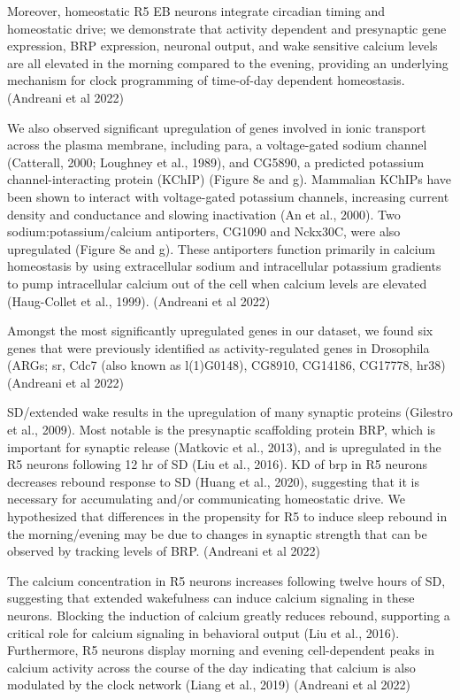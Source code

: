     Moreover, homeostatic R5 EB neurons integrate circadian timing and homeostatic drive; we demonstrate that activity dependent and presynaptic gene expression, BRP expression, neuronal output, and wake sensitive calcium levels are all elevated in the morning compared to the evening, providing an underlying mechanism for clock programming of time-of-day dependent homeostasis.
    \cite{andreaniCircadianProgrammingEllipsoid2022} (Andreani et al 2022)

    We also observed significant upregulation of genes involved in ionic transport across the plasma membrane, including para, a voltage-gated sodium channel (Catterall, 2000; Loughney et al., 1989), and CG5890, a predicted potassium channel-interacting protein (KChIP) (Figure 8e and g). Mammalian KChIPs have been shown to interact with voltage-gated potassium channels, increasing current density and conductance and slowing inactivation (An et al., 2000). Two sodium:potassium/calcium antiporters, CG1090 and Nckx30C, were also upregulated (Figure 8e and g). These antiporters function primarily in calcium homeostasis by using extracellular sodium and intracellular potassium gradients to pump intracellular calcium out of the cell when calcium levels are elevated (Haug-Collet et al., 1999).
    \cite{andreaniCircadianProgrammingEllipsoid2022} (Andreani et al 2022)

    Amongst the most significantly upregulated genes in our dataset, we found six genes that were previously identified as activity-regulated genes in Drosophila (ARGs; sr, Cdc7 (also known as l(1)G0148), CG8910, CG14186, CG17778, hr38)
    \cite{andreaniCircadianProgrammingEllipsoid2022} (Andreani et al 2022)

    SD/extended wake results in the upregulation of many synaptic proteins (Gilestro et al., 2009). Most notable is the presynaptic scaffolding protein BRP, which is important for synaptic release (Matkovic et al., 2013), and is upregulated in the R5 neurons following 12 hr of SD (Liu et al., 2016). KD of brp in R5 neurons decreases rebound response to SD (Huang et al., 2020), suggesting that it is necessary for accumulating and/or communicating homeostatic drive. We hypothesized that differences in the propensity for R5 to induce sleep rebound in the morning/evening may be due to changes in synaptic strength that can be observed by tracking levels of BRP.
    \cite{andreaniCircadianProgrammingEllipsoid2022} (Andreani et al 2022)

    The calcium concentration in R5 neurons increases following twelve hours of SD, suggesting that extended wakefulness can induce calcium signaling in these neurons. Blocking the induction of calcium greatly reduces rebound, supporting a critical role for calcium signaling in behavioral output (Liu et al., 2016). Furthermore, R5 neurons display morning and evening cell-dependent peaks in calcium activity across the course of the day indicating that calcium is also modulated by the clock network (Liang et al., 2019)
    \cite{andreaniCircadianProgrammingEllipsoid2022} (Andreani et al 2022)

